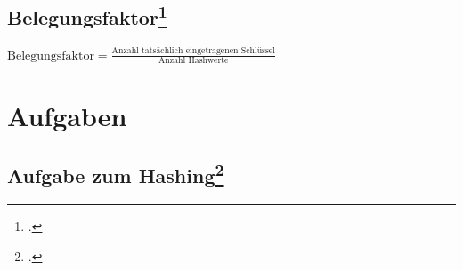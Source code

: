 \documentclass{lehramt-informatik-haupt}
\begin{document}
\section{Belegungsfaktor\footcite[Seite 29]{aud:fs:tafeluebung-10}}

$\text{Belegungsfaktor} =
\frac{\text{Anzahl tatsächlich eingetragenen Schlüssel}}
{\text{Anzahl Hashwerte}}$


\chapter{Aufgaben}

\section{Aufgabe zum Hashing\footcite[Seite 1]{aud:ab:5}}
\end{document}
